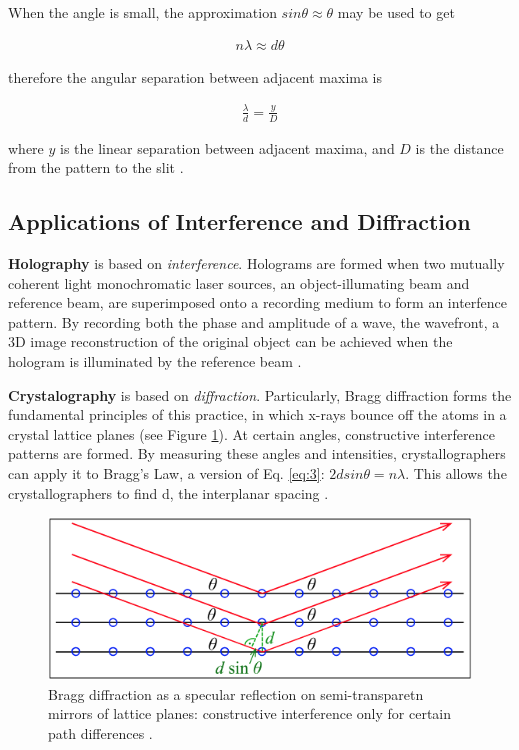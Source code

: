 \documentclass[12pt]{article}
\begin{document}
When the angle is small, the approximation $sin \theta \approx \theta$ may be used to get

\vspace{-2ex}
\begin{gather}
    n \lambda \approx d \theta
\end{gather}

therefore the angular separation between adjacent maxima is

\vspace{-2ex}
\begin{gather} \label{eq:5}
    \frac{\lambda}{d} = \frac{y}{D}
\end{gather}

where $y$ is the linear separation between adjacent maxima, and $D$ is the distance from the pattern to the slit \cite{UCDinterference}.

\subsection{Applications of Interference and Diffraction}

\textbf{Holography} is based on \textit{interference}. Holograms are formed when two mutually coherent light monochromatic laser sources, an object-illumating beam and reference beam, are superimposed onto a recording medium to form an interfence pattern. By recording both the phase
and amplitude of a wave, the wavefront, a 3D image reconstruction of the original object can be achieved when the hologram is illuminated by the reference beam \cite{Paschotta_2019_holography,ownholo}.

\textbf{Crystalography} is based on \textit{diffraction}. Particularly, Bragg diffraction forms the fundamental principles of this practice, in which x-rays bounce off the atoms in a crystal lattice planes (see Figure \ref{fig:6}). At certain angles, 
constructive interference patterns are formed. By measuring these angles and intensities, crystallographers can apply it to Bragg's Law, a version of Eq. \ref{eq:3}: $2d sin \theta = n \lambda$. This allows the crystallographers to find d, the interplanar spacing \cite{hansen2015diffraction}.

\begin{figure}[H]
    \centering
    \includegraphics[width=.8\textwidth]{bragg lattice.png}
    \caption{Bragg diffraction as a specular reflection on semi-transparetn mirrors of lattice planes: constructive interference only for certain path differences \protect\cite{hansen2015diffraction}.}
    \label{fig:6}
\end{figure}
\end{document}
